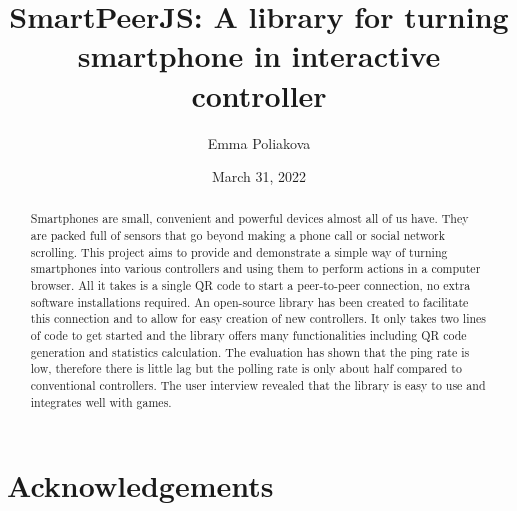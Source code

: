 \documentclass{l4proj}
\begin{document}
\title{SmartPeerJS: A library for turning smartphone in interactive controller} %
\author{Emma Poliakova}
\date{March 31, 2022}

\maketitle

\begin{abstract}
     Smartphones are small, convenient and powerful devices almost all of us have. They are packed full of sensors that go beyond making a phone call or social network scrolling. This project aims to provide and demonstrate a simple way of turning smartphones into various controllers and using them to perform actions in a computer browser. All it takes is a single QR code to start a peer-to-peer connection, no extra software installations required.  An open-source library has been created to facilitate this connection and to allow for easy creation of new controllers. It only takes two lines of code to get started and the library offers many functionalities including QR code generation and statistics calculation. The evaluation has shown that the ping rate is low, therefore there is little lag but the polling rate is only about half compared to conventional controllers. The user interview revealed that the library is easy to use and integrates well with games.
\end{abstract}

\chapter*{Acknowledgements}
%
%


%
%
\def\consentname {Emma Poliakova} %
\def\consentdate {31 March 2022} %
%
\educationalconsent
\end{document}
